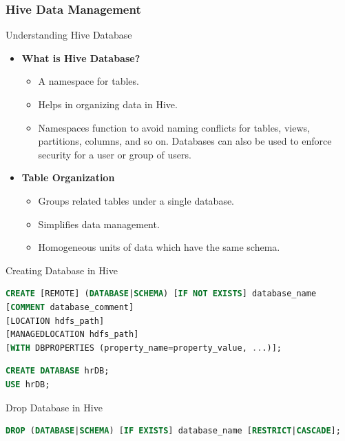 \subsubsection*{Hive Data Management}
\begin{frame}[fragile]{Understanding Hive Database}
	\begin{itemize}
	  \item \textbf{What is Hive Database?}
		\begin{itemize}
		  \item A namespace for tables.
		  \item Helps in organizing data in Hive.
		  \item Namespaces function to avoid naming conflicts for tables, views, partitions, columns, and so on.  Databases can also be used to enforce security for a user or group of users.
		\end{itemize}
	  
	  \item \textbf{Table Organization}
		\begin{itemize}
		  \item Groups related tables under a single database.
		  \item Simplifies data management.
		  \item Homogeneous units of data which have the same schema.
		\end{itemize}
		
	\end{itemize}
  \end{frame}
\begin{frame}[fragile]{Creating Database in Hive}

\begin{lstlisting}[caption={Create Database command in Hive},language=SQL]
CREATE [REMOTE] (DATABASE|SCHEMA) [IF NOT EXISTS] database_name
[COMMENT database_comment]
[LOCATION hdfs_path]
[MANAGEDLOCATION hdfs_path]
[WITH DBPROPERTIES (property_name=property_value, ...)];  
\end{lstlisting}	
\begin{lstlisting}[caption={Create Database Example},language=SQL]
CREATE DATABASE hrDB;
USE hrDB;
\end{lstlisting}		

\end{frame}  

\begin{frame}[fragile]{Drop Database in Hive}

\begin{lstlisting}[caption={Drop Database command in Hive},language=SQL]
DROP (DATABASE|SCHEMA) [IF EXISTS] database_name [RESTRICT|CASCADE];
\end{lstlisting}		
	
\end{frame} 

